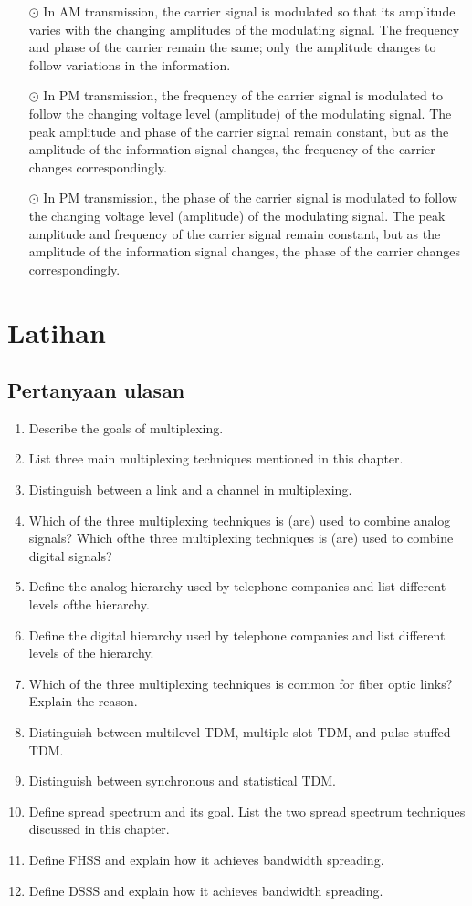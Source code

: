 \begin{itemize}
  \item[$\odot$] In AM transmission, the carrier signal is modulated so that its amplitude varies with the changing amplitudes of the modulating signal. The frequency and phase of the carrier remain the same; only the amplitude changes to follow variations in the information.
  \item[$\odot$] In PM transmission, the frequency of the carrier signal is modulated to follow the changing voltage level (amplitude) of the modulating signal. The peak amplitude and phase of the carrier signal remain constant, but as the amplitude of the information signal changes, the frequency of the carrier changes correspondingly.
  \item[$\odot$] In PM transmission, the phase of the carrier signal is modulated to follow the changing voltage level (amplitude) of the modulating signal. The peak amplitude and frequency of the carrier signal remain constant, but as the amplitude of the information signal changes, the phase of the carrier changes correspondingly.
\end{itemize}

\section{Latihan}

\subsection*{Pertanyaan ulasan}

\begin{enumerate}
  \item Describe the goals of multiplexing.
  \item List three main multiplexing techniques mentioned in this chapter. 
  \item Distinguish between a link and a channel in multiplexing. 
  \item Which of the three multiplexing techniques is (are) used to combine analog signals? Which ofthe three multiplexing techniques is (are) used to combine digital signals? 
  \item Define the analog hierarchy used by telephone companies and list different levels ofthe hierarchy. 
  \item Define the digital hierarchy used by telephone companies and list different levels of the hierarchy. 
  \item Which of the three multiplexing techniques is common for fiber optic links? Explain the reason. 
  \item Distinguish between multilevel TDM, multiple slot TDM, and pulse-stuffed TDM. 
  \item Distinguish between synchronous and statistical TDM. 
  \item Define spread spectrum and its goal. List the two spread spectrum techniques discussed in this chapter. 
  \item Define FHSS and explain how it achieves bandwidth spreading. 
  \item Define DSSS and explain how it achieves bandwidth spreading.
\end{enumerate}

